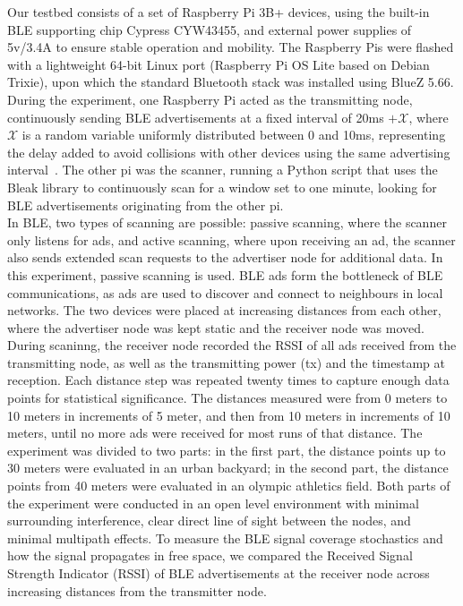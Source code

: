 Our testbed consists of a set of Raspberry Pi 3B+ devices, using the built-in BLE supporting chip Cypress CYW43455, and external power supplies of 5v/3.4A to ensure stable operation and mobility.
The Raspberry Pis were flashed with a lightweight 64-bit Linux port (Raspberry Pi OS Lite based on Debian Trixie), upon which the standard Bluetooth stack was installed using BlueZ 5.66.
During the experiment, one Raspberry Pi acted as the transmitting node, continuously sending BLE advertisements at a fixed interval of 20ms $+\mathcal{X}$, where $\mathcal{X}$ is a random variable uniformly distributed between 0 and 10ms, representing the delay added to avoid collisions with other devices using the same advertising interval~\cite{nordic-bt,bt-spec}.
The other pi was the scanner, running a Python script that uses the Bleak library to continuously scan for a window set to one minute, looking for BLE advertisements originating from the other pi.\\
In BLE, two types of scanning are possible: passive scanning, where the scanner only listens for ads, and active scanning, where upon receiving an ad, the scanner also sends extended scan requests to the advertiser node for additional data. 
In this experiment, passive scanning is used.%
BLE ads form the bottleneck of BLE communications, as ads are used to discover and connect to neighbours in local networks.
The two devices were placed at increasing distances from each other, where the advertiser node was kept static and the receiver node was moved.
During scaninng, the receiver node recorded the RSSI of all ads received from the transmitting node, as well as the transmitting power (tx) and the timestamp at reception.
Each distance step was repeated twenty times to capture enough data points for statistical significance.
The distances measured were from 0 meters to 10 meters in increments of 5 meter, and then from 10 meters in increments of 10 meters, until no more ads were received for most runs of that distance.
The experiment was divided to two parts: in the first part, the distance points up to 30 meters were evaluated in an urban backyard; in the second part, the distance points from 40 meters were evaluated in an olympic athletics field.
Both parts of the experiment were conducted in an open level environment with minimal surrounding interference, clear direct line of sight between the nodes, and minimal multipath effects.
To measure the BLE signal coverage stochastics and how the signal propagates in free space, we compared the Received Signal Strength Indicator (RSSI) of BLE advertisements at the receiver node across increasing distances from the transmitter node.

